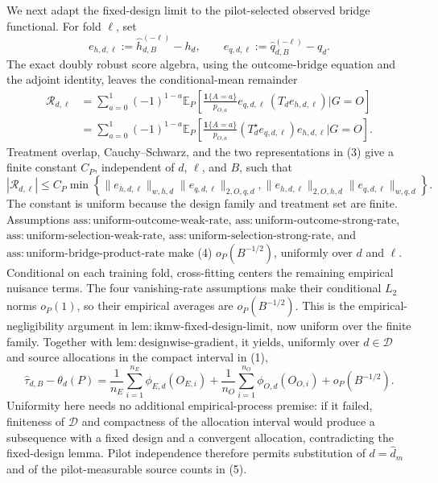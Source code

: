 We next adapt the fixed-design limit to the pilot-selected observed bridge functional.  For fold \(\ell\), set
\[
 e_{h,d,\ell}:=\widehat h_{d,B}^{(-\ell)}-h_d,
 \qquad
 e_{q,d,\ell}:=\widehat q_{d,B}^{(-\ell)}-q_d.
\]
The exact doubly robust score algebra, using the outcome-bridge equation and the adjoint identity, leaves the conditional-mean remainder
\[
\begin{aligned}
 \mathcal R_{d,\ell}
 &=\sum_{a=0}^1(-1)^{1-a}
 \mathbb E_P\!\left[
 \frac{\mathbf 1\{A=a\}}{p_{O,a}}
 e_{q,d,\ell}\,(T_de_{h,d,\ell})\mathrel{\Big|}G=O\right]\\
 &=\sum_{a=0}^1(-1)^{1-a}
 \mathbb E_P\!\left[
 \frac{\mathbf 1\{A=a\}}{p_{O,a}}
 (T_d^\star e_{q,d,\ell})e_{h,d,\ell}\mathrel{\Big|}G=O\right].
\end{aligned}                                                              \tag{3}
\]
Treatment overlap, Cauchy--Schwarz, and the two representations in (3) give a finite constant \(C_P\), independent of \(d\), \(\ell\), and \(B\), such that
\[
 |\mathcal R_{d,\ell}|
 \le C_P\min\left\{
 \|e_{h,d,\ell}\|_{w,h,d}\|e_{q,d,\ell}\|_{2,O,q,d},
 \|e_{h,d,\ell}\|_{2,O,h,d}\|e_{q,d,\ell}\|_{w,q,d}
 \right\}.                                                               \tag{4}
\]
The constant is uniform because the design family and treatment set are finite.  Assumptions \(\mathrm{ass{:}uniform\text{-}outcome\text{-}weak\text{-}rate}\), \(\mathrm{ass{:}uniform\text{-}outcome\text{-}strong\text{-}rate}\), \(\mathrm{ass{:}uniform\text{-}selection\text{-}weak\text{-}rate}\), \(\mathrm{ass{:}uniform\text{-}selection\text{-}strong\text{-}rate}\), and \(\mathrm{ass{:}uniform\text{-}bridge\text{-}product\text{-}rate}\) make (4) \(o_P(B^{-1/2})\), uniformly over \(d\) and \(\ell\).  Conditional on each training fold, cross-fitting centers the remaining empirical nuisance terms.  The four vanishing-rate assumptions make their conditional \(L_2\) norms \(o_P(1)\), so their empirical averages are \(o_P(B^{-1/2})\).  This is the empirical-negligibility argument in \(\mathrm{lem{:}ikmw\text{-}fixed\text{-}design\text{-}limit}\), now uniform over the finite family.  Together with \(\mathrm{lem{:}designwise\text{-}gradient}\), it yields, uniformly over \(d\in\mathcal D\) and source allocations in the compact interval in (1),
\[
 \widehat\tau_{d,B}-\theta_d(P)
 =\frac1{n_E}\sum_{i=1}^{n_E}\phi_{E,d}(O_{E,i})
  +\frac1{n_O}\sum_{i=1}^{n_O}\phi_{O,d}(O_{O,i})
  +o_P(B^{-1/2}).                                                          \tag{5}
\]
Uniformity here needs no additional empirical-process premise: if it failed, finiteness of \(\mathcal D\) and compactness of the allocation interval would produce a subsequence with a fixed design and a convergent allocation, contradicting the fixed-design lemma.  Pilot independence therefore permits substitution of \(d=\widehat d_m\) and of the pilot-measurable source counts in (5).


